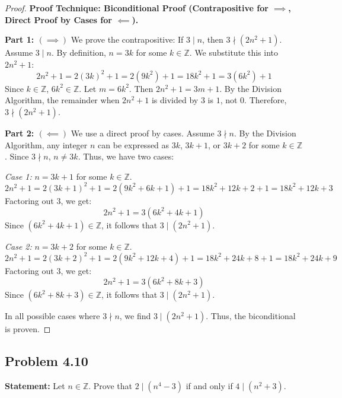 \documentclass[11pt]{article}
\theoremstyle{definition}
\theoremstyle{remark}
\newcommand{\Z}{\mathbb{Z}}
\begin{document}
\begin{proof}
\textbf{Proof Technique: Biconditional Proof (Contrapositive for $\implies$, Direct Proof by Cases for $\impliedby$).}

\textbf{Part 1: $(\implies)$} We prove the contrapositive: If $3 \mid n$, then $3 \nmid (2n^2 + 1)$.
Assume $3 \mid n$. By definition, $n = 3k$ for some $k \in \Z$. We substitute this into $2n^2 + 1$:
\[ 2n^2 + 1 = 2(3k)^2 + 1 = 2(9k^2) + 1 = 18k^2 + 1 = 3(6k^2) + 1 \]
Since $k \in \Z$, $6k^2 \in \Z$. Let $m = 6k^2$. Then $2n^2 + 1 = 3m + 1$. By the Division Algorithm, the remainder when $2n^2 + 1$ is divided by $3$ is $1$, not $0$. Therefore, $3 \nmid (2n^2 + 1)$.

\textbf{Part 2: $(\impliedby)$} We use a direct proof by cases. Assume $3 \nmid n$. 
By the Division Algorithm, any integer $n$ can be expressed as $3k$, $3k+1$, or $3k+2$ for some $k \in \Z$. Since $3 \nmid n$, $n \neq 3k$. Thus, we have two cases:

\textit{Case 1:} $n = 3k + 1$ for some $k \in \Z$.
\[ 2n^2 + 1 = 2(3k + 1)^2 + 1 = 2(9k^2 + 6k + 1) + 1 = 18k^2 + 12k + 2 + 1 = 18k^2 + 12k + 3 \]
Factoring out $3$, we get:
\[ 2n^2 + 1 = 3(6k^2 + 4k + 1) \]
Since $(6k^2 + 4k + 1) \in \Z$, it follows that $3 \mid (2n^2 + 1)$.

\textit{Case 2:} $n = 3k + 2$ for some $k \in \Z$.
\[ 2n^2 + 1 = 2(3k + 2)^2 + 1 = 2(9k^2 + 12k + 4) + 1 = 18k^2 + 24k + 8 + 1 = 18k^2 + 24k + 9 \]
Factoring out $3$, we get:
\[ 2n^2 + 1 = 3(6k^2 + 8k + 3) \]
Since $(6k^2 + 8k + 3) \in \Z$, it follows that $3 \mid (2n^2 + 1)$.

In all possible cases where $3 \nmid n$, we find $3 \mid (2n^2 + 1)$. Thus, the biconditional is proven.
\end{proof}

\subsection{Problem 4.10}
\textbf{Statement:} Let $n \in \Z$. Prove that $2 \mid (n^4 - 3)$ if and only if $4 \mid (n^2 + 3)$.
\end{document}

